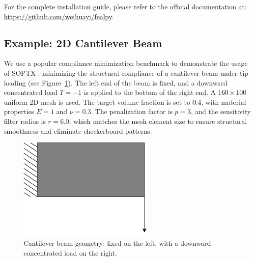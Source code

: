 \documentclass[mathpazo]{cicp}
\begin{document}
For the complete installation guide, please refer to the official documentation at: \url{https://github.com/weihuayi/fealpy}.

\subsection{Example: 2D Cantilever Beam} 
We use a popular compliance minimization benchmark to demonstrate the usage of SOPTX \cite{bendsoe2013topology}: minimizing the structural compliance of a cantilever beam under tip loading (see Figure~\ref{fig:cantilever}). The left end of the beam is fixed, and a downward concentrated load $T = -1$ is applied to the bottom of the right end. A $160 \times 100$ uniform 2D mesh is used. The target volume fraction is set to $0.4$, with material properties $E = 1$ and $\nu = 0.3$. The penalization factor is $p = 3$, and the sensitivity filter radius is $r = 6.0$, which matches the mesh element size to ensure structural smoothness and eliminate checkerboard patterns.
\begin{figure}[htp]
	\centering
	\includegraphics[width=0.6\textwidth]{figures/cantilever_2d.png}
	\caption{Cantilever beam geometry: fixed on the left, with a downward concentrated load on the right.}
	\label{fig:cantilever}
\end{figure}
\end{document}
